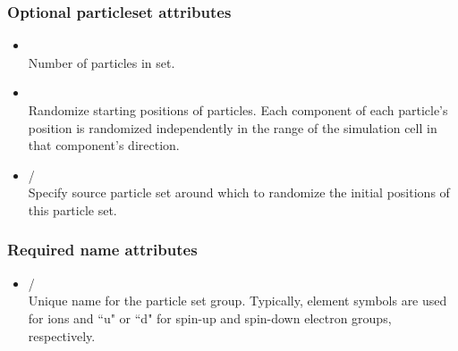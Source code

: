 \subsubsection{Optional particleset attributes}

\begin{itemize}
\item {} \\
Number of particles in set.
\end{itemize}


\begin{itemize}
\item {} \\
Randomize starting positions of particles. Each component of each particle's position is randomized independently in the range of the simulation cell in that component's direction. 
\end{itemize}

\begin{itemize}
\item {}/ \\
Specify source particle set around which to randomize the initial positions of this particle set.
\end{itemize}

\subsubsection{Required name attributes}

\begin{itemize}
\item {}/ \\
Unique name for the particle set group. Typically, element symbols are used for ions and ``u" or ``d" for spin-up and spin-down electron groups, respectively. 
\end{itemize}

